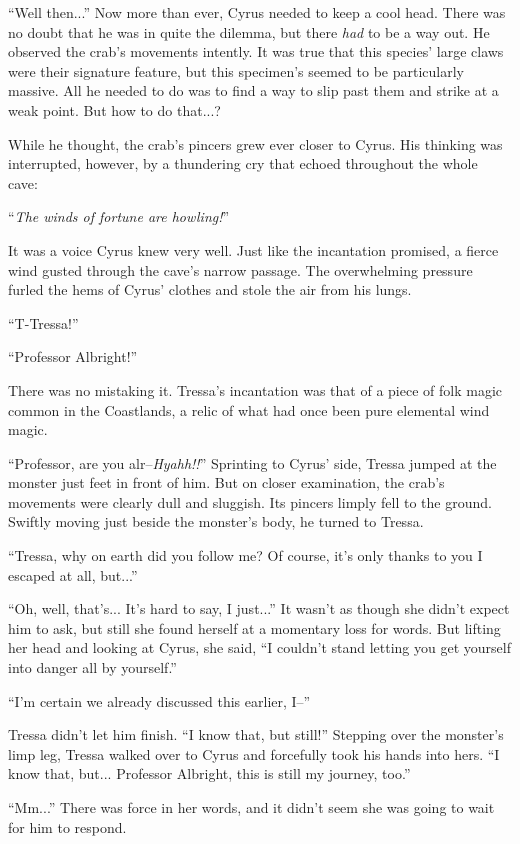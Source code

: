 ``Well then...'' Now more than ever, Cyrus needed to keep a cool head. There was no doubt that he was in quite the dilemma, but there \emph{had} to be a way out. He observed the crab's movements intently. It was true that this species' large claws were their signature feature, but this specimen's seemed to be particularly massive. All he needed to do was to find a way to slip past them and strike at a weak point. But how to do that...?

While he thought, the crab's pincers grew ever closer to Cyrus. His thinking was interrupted, however, by a thundering cry that echoed throughout the whole cave:

``\emph{The winds of fortune are howling!}''

It was a voice Cyrus knew very well. Just like the incantation promised, a fierce wind gusted through the cave's narrow passage. The overwhelming pressure furled the hems of Cyrus' clothes and stole the air from his lungs.

``T-Tressa!''

``Professor Albright!''

There was no mistaking it. Tressa's incantation was that of a piece of folk magic common in the Coastlands, a relic of what had once been pure elemental wind magic.

``Professor, are you alr--\emph{Hyahh!!}'' Sprinting to Cyrus' side, Tressa jumped at the monster just feet in front of him. But on closer examination, the crab's movements were clearly dull and sluggish. Its pincers limply fell to the ground. Swiftly moving just beside the monster's body, he turned to Tressa.

``Tressa, why on earth did you follow me? Of course, it's only thanks to you I escaped at all, but...''

``Oh, well, that's... It's hard to say, I just...'' It wasn't as though she didn't expect him to ask, but still she found herself at a momentary loss for words. But lifting her head and looking at Cyrus, she said, ``I couldn't stand letting you get yourself into danger all by yourself.''

``I'm certain we already discussed this earlier, I--''

Tressa didn't let him finish. ``I know that, but still!'' Stepping over the monster's limp leg, Tressa walked over to Cyrus and forcefully took his hands into hers. ``I know that, but... Professor Albright, this is still my journey, too.''

``Mm...'' There was force in her words, and it didn't seem she was going to wait for him to respond.

